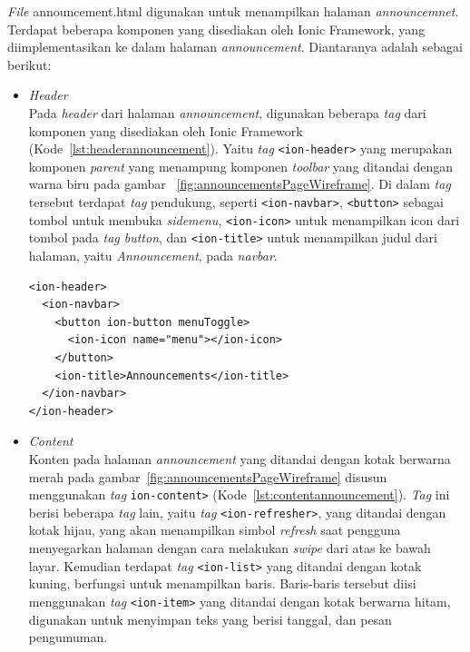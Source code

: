 \begin{enumerate}
	\textit{File} announcement.html digunakan untuk menampilkan halaman \textit{announcemnet}. Terdapat beberapa komponen yang disediakan oleh Ionic Framework, yang diimplementasikan ke dalam halaman \textit{announcement}. Diantaranya adalah sebagai berikut:	
	
	\begin{itemize}
		\item \textit{Header} \\
		Pada \textit{header} dari halaman \textit{announcement}, digunakan beberapa \textit{tag} dari komponen yang disediakan oleh Ionic Framework (Kode~\ref{lst:headerannouncement}). Yaitu \textit{tag} \texttt{<ion-header>} yang merupakan komponen \textit{parent} yang menampung komponen \textit{toolbar} yang ditandai dengan warna biru pada gambar ~\ref{fig:announcementsPageWireframe}. Di dalam \textit{tag} tersebut terdapat \textit{tag} pendukung, seperti \texttt{<ion-navbar>}, \texttt{<button>} sebagai tombol untuk membuka \textit{sidemenu}, \texttt{<ion-icon>} untuk menampilkan icon dari tombol pada \textit{tag button}, dan \texttt{<ion-title>} untuk menampilkan judul dari halaman, yaitu \textit{Announcement}, pada \textit{navbar}.
\begin{lstlisting}[label={lst:headerannouncement}, caption=\textit{Header} pada Halaman \textit{Annoncement}]
<ion-header>
  <ion-navbar>
    <button ion-button menuToggle>
      <ion-icon name="menu"></ion-icon>
    </button>
    <ion-title>Announcements</ion-title>
  </ion-navbar>
</ion-header>
\end{lstlisting} 

		\item \textit{Content} \\
		Konten pada halaman \textit{announcement} yang ditandai dengan kotak berwarna merah pada gambar~\ref{fig:announcementsPageWireframe} disusun menggunakan \textit{tag} \texttt{ion-content>} (Kode~\ref{lst:contentannouncement}). \textit{Tag} ini berisi beberapa \textit{tag} lain, yaitu \textit{tag} \texttt{<ion-refresher>}, yang ditandai dengan kotak hijau, yang akan menampilkan simbol \textit{refresh} saat pengguna menyegarkan halaman dengan cara melakukan \textit{swipe} dari atas ke bawah layar. Kemudian terdapat \textit{tag} \texttt{<ion-list>} yang ditandai dengan kotak kuning, berfungsi untuk menampilkan baris. Baris-baris tersebut diisi menggunakan \textit{tag} \texttt{<ion-item>} yang ditandai dengan kotak berwarna hitam, digunakan untuk menyimpan teks yang berisi tanggal, dan pesan pengumuman.


\end{itemize}
\end{enumerate}
